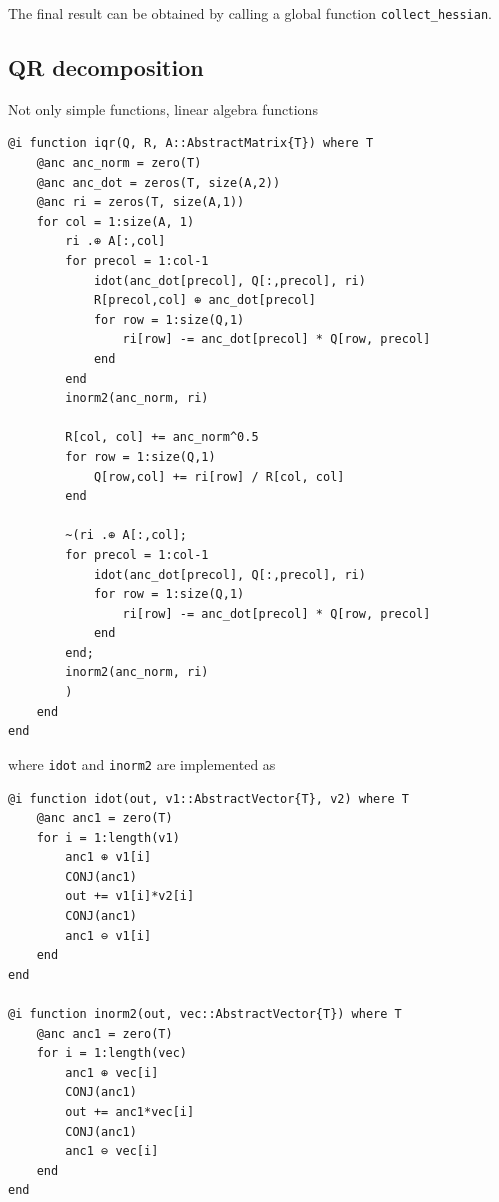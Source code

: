 \documentclass[aps,twocolumn,longbibliography,english,superscriptaddress,prr]{revtex4-1}
\newcommand{\<}{\langle}
\renewcommand{\>}{\rangle}
\begin{document}
The final result can be obtained by calling a global function \texttt{collect\_hessian}.

\subsection{QR decomposition}

Not only simple functions, linear algebra functions 

\begin{minipage}{.44\textwidth}
\begin{lstlisting}
@i function iqr(Q, R, A::AbstractMatrix{T}) where T
    @anc anc_norm = zero(T)
    @anc anc_dot = zeros(T, size(A,2))
    @anc ri = zeros(T, size(A,1))
    for col = 1:size(A, 1)
        ri .⊕ A[:,col]
        for precol = 1:col-1
            idot(anc_dot[precol], Q[:,precol], ri)
            R[precol,col] ⊕ anc_dot[precol]
            for row = 1:size(Q,1)
                ri[row] -= anc_dot[precol] * Q[row, precol]
            end
        end
        inorm2(anc_norm, ri)

        R[col, col] += anc_norm^0.5
        for row = 1:size(Q,1)
            Q[row,col] += ri[row] / R[col, col]
        end

        ~(ri .⊕ A[:,col];
        for precol = 1:col-1
            idot(anc_dot[precol], Q[:,precol], ri)
            for row = 1:size(Q,1)
                ri[row] -= anc_dot[precol] * Q[row, precol]
            end
        end;
        inorm2(anc_norm, ri)
        )
    end
end
\end{lstlisting}
\end{minipage}

where \texttt{idot} and \texttt{inorm2} are implemented as

\begin{minipage}{.44\textwidth}
\begin{lstlisting}
@i function idot(out, v1::AbstractVector{T}, v2) where T
    @anc anc1 = zero(T)
    for i = 1:length(v1)
        anc1 ⊕ v1[i]
        CONJ(anc1)
        out += v1[i]*v2[i]
        CONJ(anc1)
        anc1 ⊖ v1[i]
    end
end

@i function inorm2(out, vec::AbstractVector{T}) where T
    @anc anc1 = zero(T)
    for i = 1:length(vec)
        anc1 ⊕ vec[i]
        CONJ(anc1)
        out += anc1*vec[i]
        CONJ(anc1)
        anc1 ⊖ vec[i]
    end
end
\end{lstlisting}
\end{minipage}
\end{document}
